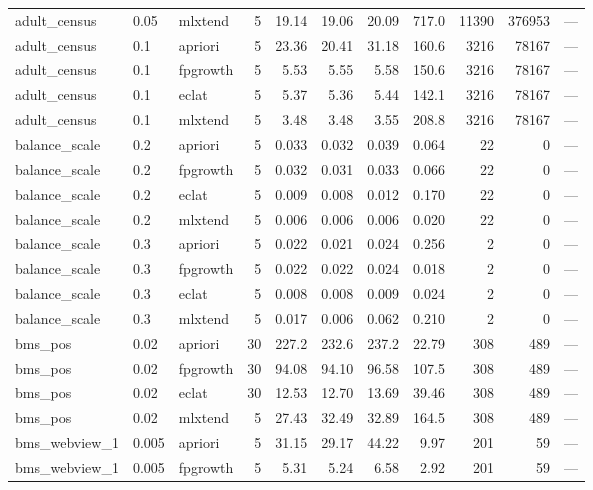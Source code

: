 \documentclass[journal,a4paper]{IEEEtran}
\begin{document}
\begin{longtable}{p{3.0cm}llrrrrrrrp{2.4cm}}
adult\_\allowbreak{}census & 0.05 & mlxtend & 5 & 19.14 & 19.06 & 20.09 & 717.0 & 11390 & 376953 & --- \\
adult\_\allowbreak{}census & 0.1 & apriori & 5 & 23.36 & 20.41 & 31.18 & 160.6 & 3216 & 78167 & --- \\
adult\_\allowbreak{}census & 0.1 & fpgrowth & 5 & 5.53 & 5.55 & 5.58 & 150.6 & 3216 & 78167 & --- \\
adult\_\allowbreak{}census & 0.1 & eclat & 5 & 5.37 & 5.36 & 5.44 & 142.1 & 3216 & 78167 & --- \\
adult\_\allowbreak{}census & 0.1 & mlxtend & 5 & 3.48 & 3.48 & 3.55 & 208.8 & 3216 & 78167 & --- \\
balance\_\allowbreak{}scale & 0.2 & apriori & 5 & 0.033 & 0.032 & 0.039 & 0.064 & 22 & 0 & --- \\
balance\_\allowbreak{}scale & 0.2 & fpgrowth & 5 & 0.032 & 0.031 & 0.033 & 0.066 & 22 & 0 & --- \\
balance\_\allowbreak{}scale & 0.2 & eclat & 5 & 0.009 & 0.008 & 0.012 & 0.170 & 22 & 0 & --- \\
balance\_\allowbreak{}scale & 0.2 & mlxtend & 5 & 0.006 & 0.006 & 0.006 & 0.020 & 22 & 0 & --- \\
balance\_\allowbreak{}scale & 0.3 & apriori & 5 & 0.022 & 0.021 & 0.024 & 0.256 & 2 & 0 & --- \\
balance\_\allowbreak{}scale & 0.3 & fpgrowth & 5 & 0.022 & 0.022 & 0.024 & 0.018 & 2 & 0 & --- \\
balance\_\allowbreak{}scale & 0.3 & eclat & 5 & 0.008 & 0.008 & 0.009 & 0.024 & 2 & 0 & --- \\
balance\_\allowbreak{}scale & 0.3 & mlxtend & 5 & 0.017 & 0.006 & 0.062 & 0.210 & 2 & 0 & --- \\
bms\_\allowbreak{}pos & 0.02 & apriori & 30 & 227.2 & 232.6 & 237.2 & 22.79 & 308 & 489 & --- \\
bms\_\allowbreak{}pos & 0.02 & fpgrowth & 30 & 94.08 & 94.10 & 96.58 & 107.5 & 308 & 489 & --- \\
bms\_\allowbreak{}pos & 0.02 & eclat & 30 & 12.53 & 12.70 & 13.69 & 39.46 & 308 & 489 & --- \\
bms\_\allowbreak{}pos & 0.02 & mlxtend & 5 & 27.43 & 32.49 & 32.89 & 164.5 & 308 & 489 & --- \\
bms\_\allowbreak{}webview\_\allowbreak{}1 & 0.005 & apriori & 5 & 31.15 & 29.17 & 44.22 & 9.97 & 201 & 59 & --- \\
bms\_\allowbreak{}webview\_\allowbreak{}1 & 0.005 & fpgrowth & 5 & 5.31 & 5.24 & 6.58 & 2.92 & 201 & 59 & --- \\

\end{longtable}
\end{document}

